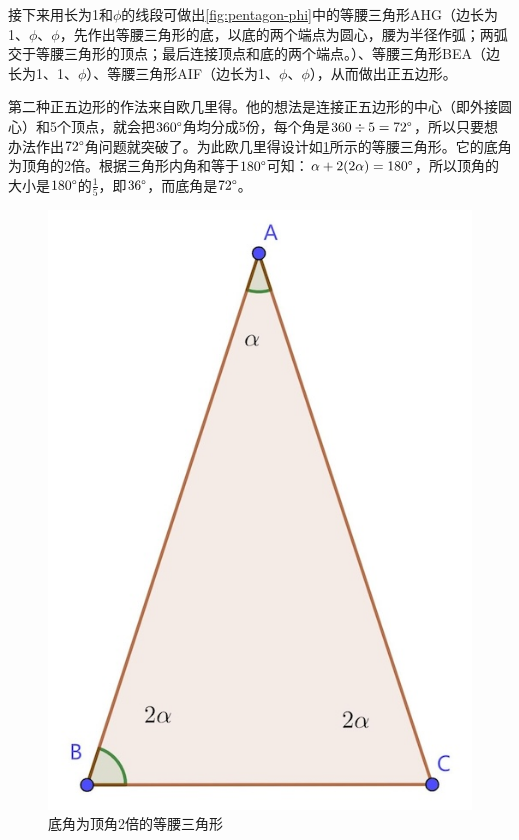 \documentclass[b5paper]{ctexart}
\begin{document}
接下来用长为1和$\phi$的线段可做出\cref{fig:pentagon-phi}中的等腰三角形AHG（边长为1、$\phi$、$\phi$，先作出等腰三角形的底，以底的两个端点为圆心，腰为半径作弧；两弧交于等腰三角形的顶点；最后连接顶点和底的两个端点。）、等腰三角形BEA（边长为1、1、$\phi$）、等腰三角形AIF（边长为1、$\phi$、$\phi$），从而做出正五边形。

第二种正五边形的作法来自欧几里得。他的想法是连接正五边形的中心（即外接圆心）和5个顶点，就会把$360\degree$角均分成5份，每个角是$360 \div 5 = 72\degree$，所以只要想办法作出$72\degree$角问题就突破了。为此欧几里得设计如\cref{fig:isosceles72}所示的等腰三角形。它的底角为顶角的2倍。根据三角形内角和等于$180\degree$可知：$\alpha + 2(2\alpha) = 180\degree$，所以顶角的大小是$180\degree$的$\frac{1}{5}$，即$36\degree$，而底角是$72\degree$。

\begin{figure}[htbp]
 \centering
 \includegraphics[scale=0.35]{img/isosceles72}
 \caption{底角为顶角2倍的等腰三角形}
 \label{fig:isosceles72}
\end{figure}
\end{document}
